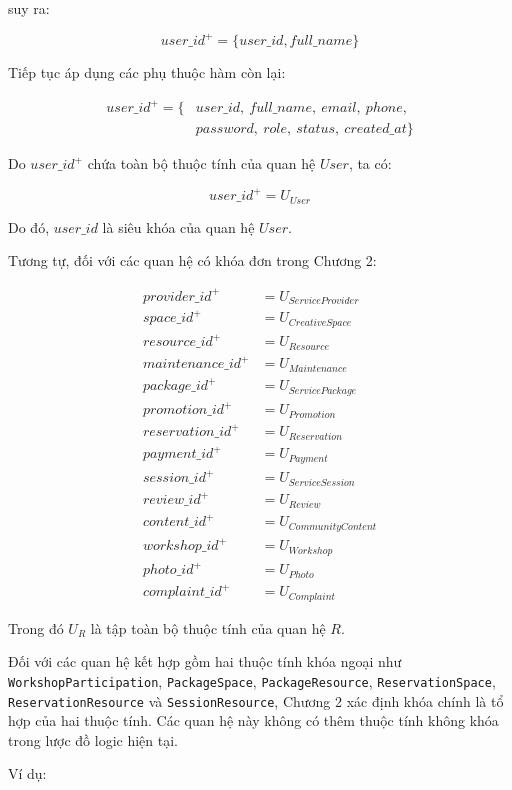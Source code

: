 suy ra:

\[
user\_id^+ =
\{user\_id,full\_name\}
\]

Tiếp tục áp dụng các phụ thuộc hàm còn lại:

\[
\begin{aligned}
	user\_id^+ = \{&
	user\_id,\ full\_name,\ email,\ phone,\\
	&password,\ role,\ status,\ created\_at
	\}
\end{aligned}
\]

Do $user\_id^+$ chứa toàn bộ thuộc tính của quan hệ $User$, ta có:

\[
user\_id^+ = U_{User}
\]

Do đó, $user\_id$ là siêu khóa của quan hệ $User$.

Tương tự, đối với các quan hệ có khóa đơn trong Chương 2:

\[
\begin{aligned}
	provider\_id^+ &= U_{ServiceProvider}\\
	space\_id^+ &= U_{CreativeSpace}\\
	resource\_id^+ &= U_{Resource}\\
	maintenance\_id^+ &= U_{Maintenance}\\
	package\_id^+ &= U_{ServicePackage}\\
	promotion\_id^+ &= U_{Promotion}\\
	reservation\_id^+ &= U_{Reservation}\\
	payment\_id^+ &= U_{Payment}\\
	session\_id^+ &= U_{ServiceSession}\\
	review\_id^+ &= U_{Review}\\
	content\_id^+ &= U_{CommunityContent}\\
	workshop\_id^+ &= U_{Workshop}\\
	photo\_id^+ &= U_{Photo}\\
	complaint\_id^+ &= U_{Complaint}
\end{aligned}
\]

Trong đó $U_R$ là tập toàn bộ thuộc tính của quan hệ $R$.

Đối với các quan hệ kết hợp gồm hai thuộc tính khóa ngoại như
\texttt{WorkshopParticipation}, \texttt{PackageSpace},
\texttt{PackageResource}, \texttt{ReservationSpace},
\texttt{ReservationResource} và \texttt{SessionResource}, Chương 2 xác định
khóa chính là tổ hợp của hai thuộc tính. Các quan hệ này không có thêm
thuộc tính không khóa trong lược đồ logic hiện tại.

Ví dụ:

